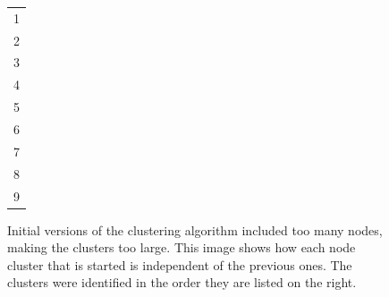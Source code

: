 \begin{figure}[tbhp]
	\begin{minipage}[c]{0.80\linewidth}
		\centering
	\end{minipage}%
	\quad
	\begin{minipage}[c]{0.1\linewidth}
		\centering
		\begin{tabular}[b]{ l }
			\cellcolor{lyellow}1 \\
			\cellcolor{lorange}2 \\
			\cellcolor{lbrown}3 \\
			\cellcolor{lgreen}4 \\
			\cellcolor{lblue}5 \\
			\cellcolor{lpurple}6 \\
			\cellcolor{lred}7 \\
			\cellcolor{silver}8 \\
			\cellcolor{lgrey}9 \\
		\end{tabular}
	\end{minipage}
	\caption{Initial versions of the clustering algorithm included too many
	nodes, making the clusters too large. This image shows how each node
	cluster that is started is independent of the previous ones. The clusters
	were identified in the order they are listed on the right.}
	\label{fig:multiple-clusters-colours}
\end{figure}

